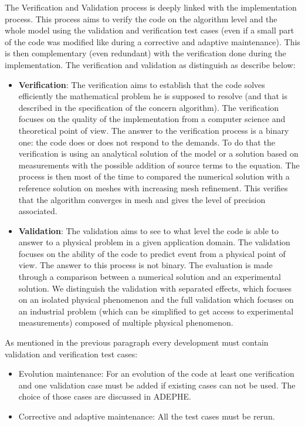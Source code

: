 The Verification and Validation process is deeply linked with the
implementation process. This process aims to verify the code on the algorithm
level and the whole model using the validation and verification test cases
(even if a small part of the code was modified like during a corrective and
adaptive maintenance). This is then complementary (even redundant) with the
verification done during the implementation.  The verification and validation
as distinguish as describe below:
\begin{itemize}
\item \textbf{Verification}: The verification aims to establish that the code
solves efficiently the mathematical problem he is supposed to resolve (and that
is described in the specification of the concern algorithm). The verification
focuses on the quality of the implementation from a computer science and
theoretical point of view. The answer to the verification process is a binary
one: the code does or does not respond to the demands. To do that the
verification is using an analytical solution of the model or a solution based
on measurements with the possible addition of source terms to the equation. The
process is then most of the time to compared the numerical solution with a
reference solution on meshes with increasing mesh refinement. This verifies
that the algorithm converges in mesh and gives the level of precision
associated.
\item \textbf{Validation}: The validation aims to see to what level the code is
able to answer to a physical problem in a given application domain.  The
validation focuses on the ability of the code to predict event from a physical
point of view. The answer to this process is not binary. The evaluation is made
through a comparison between a numerical solution and an experimental solution.
We distinguish the validation with separated effects, which focuses on an
isolated physical phenomenon and the full validation which focuses on an
industrial problem (which can be simplified to get access to experimental
measurements) composed of multiple physical phenomenon.
\end{itemize}

As mentioned in the previous paragraph every development must contain
validation and verification test cases:
\begin{itemize}
\item Evolution maintenance: For an evolution of the code at least one
verification and one validation case must be added if existing cases can not be
used. The choice of those cases are discussed in ADEPHE.
\item Corrective and adaptive maintenance: All the test cases must be rerun.
\end{itemize}

